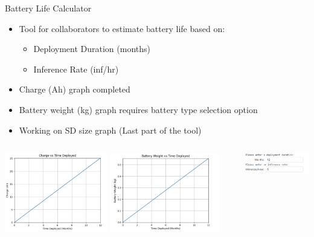 \begin{frame}{Battery Life Calculator}
    \begin{itemize}
        \item Tool for collaborators to estimate battery life based on:
        \begin{itemize}
            \item Deployment Duration (months)
            \item Inference Rate (inf/hr)
        \end{itemize}
        \item Charge (Ah) graph completed
        \item Battery weight (kg) graph requires battery type selection option
        \item Working on SD size graph (Last part of the tool)
    \end{itemize}
    \begin{columns}
        \begin{column}{0.70\textwidth}
            \includegraphics[height=0.45\textheight,width=0.45\textwidth,keepaspectratio]{images/BatteryCharge.png}
            \hfill
            \includegraphics[height=0.45\textheight,width=0.48\textwidth,keepaspectratio]{images/BatteryWeight.png}
        \end{column}

        \begin{column}{0.30\textwidth}
            \vspace*{-1cm}
            \includegraphics[height=1\textheight,width=1\textwidth,keepaspectratio]{images/BatteryLifePrompt.png}
        \end{column}
    \end{columns}
\end{frame}

